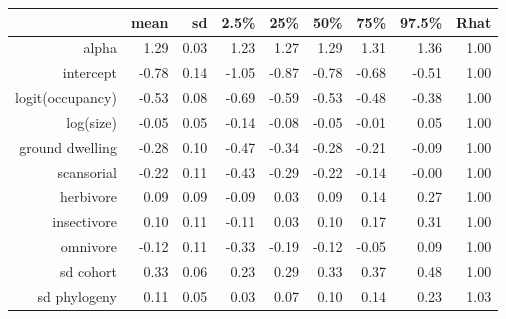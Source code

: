 \begin{table}[ht]
\centering
\begin{tabular}{rrrrrrrrr}
  \hline
 & mean & sd & 2.5\% & 25\% & 50\% & 75\% & 97.5\% & Rhat \\ 
  \hline
alpha & 1.29 & 0.03 & 1.23 & 1.27 & 1.29 & 1.31 & 1.36 & 1.00 \\ 
  intercept & -0.78 & 0.14 & -1.05 & -0.87 & -0.78 & -0.68 & -0.51 & 1.00 \\ 
  logit(occupancy) & -0.53 & 0.08 & -0.69 & -0.59 & -0.53 & -0.48 & -0.38 & 1.00 \\ 
  log(size) & -0.05 & 0.05 & -0.14 & -0.08 & -0.05 & -0.01 & 0.05 & 1.00 \\ 
  ground dwelling & -0.28 & 0.10 & -0.47 & -0.34 & -0.28 & -0.21 & -0.09 & 1.00 \\ 
  scansorial & -0.22 & 0.11 & -0.43 & -0.29 & -0.22 & -0.14 & -0.00 & 1.00 \\ 
  herbivore & 0.09 & 0.09 & -0.09 & 0.03 & 0.09 & 0.14 & 0.27 & 1.00 \\ 
  insectivore & 0.10 & 0.11 & -0.11 & 0.03 & 0.10 & 0.17 & 0.31 & 1.00 \\ 
  omnivore & -0.12 & 0.11 & -0.33 & -0.19 & -0.12 & -0.05 & 0.09 & 1.00 \\ 
  sd cohort & 0.33 & 0.06 & 0.23 & 0.29 & 0.33 & 0.37 & 0.48 & 1.00 \\ 
  sd phylogeny & 0.11 & 0.05 & 0.03 & 0.07 & 0.10 & 0.14 & 0.23 & 1.03 \\ 
   \hline
\end{tabular}
\label{post_sum}
\end{table}
